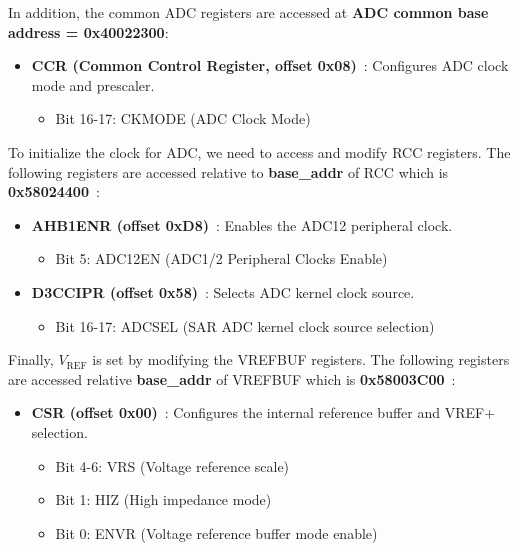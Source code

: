 \documentclass[12pt,a4paper]{article}
\begin{document}
In addition, the common ADC registers are accessed at \textbf{ADC common base address = 0x40022300}:

\begin{itemize}
    \item \textbf{CCR (Common Control Register, offset 0x08)}~\cite[pp.~1035]{ref-manual}: Configures ADC clock mode and prescaler.
    \begin{itemize}
        \item Bit 16-17: CKMODE (ADC Clock Mode)
    \end{itemize}
\end{itemize}

To initialize the clock for ADC, we need to access and modify RCC registers. The following registers are accessed relative to \textbf{base\_addr} of RCC which is \textbf{0x58024400}~\cite[pp.~132]{ref-manual}:

\begin{itemize}
    \item \textbf{AHB1ENR (offset 0xD8)}~\cite[pp.~467]{ref-manual}: Enables the ADC12 peripheral clock.
    \begin{itemize}
        \item Bit 5: ADC12EN (ADC1/2 Peripheral Clocks Enable)
    \end{itemize}
    \item \textbf{D3CCIPR (offset 0x58)}~\cite[pp.~417]{ref-manual}: Selects ADC kernel clock source.
    \begin{itemize}
        \item Bit 16-17: ADCSEL (SAR ADC kernel clock source selection)
    \end{itemize}
\end{itemize}

Finally, $V_{\text{REF}}$ is set by modifying the VREFBUF registers. The following registers are accessed relative \textbf{base\_addr} of VREFBUF which is \textbf{0x58003C00}~\cite[pp.~133]{ref-manual}:

\begin{itemize}

    \item \textbf{CSR (offset 0x00)}~\cite[pp.~297]{ref-manual}: Configures the internal reference buffer and VREF+ selection.
    \begin{itemize}
        \item Bit 4-6: VRS (Voltage reference scale)
        \item Bit 1: HIZ (High impedance mode)
        \item Bit 0: ENVR (Voltage reference buffer mode enable)
    \end{itemize}
\end{itemize}
\end{document}
